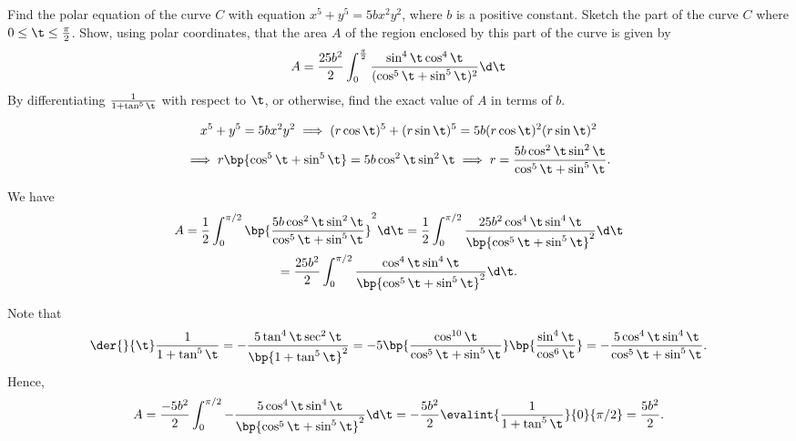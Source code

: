 \begin{problem}
    Find the polar equation of the curve $C$ with equation $x^5 + y^5 = 5bx^2y^2$, where $b$ is a positive constant. Sketch the part of the curve $C$ where $0 \leq \t \leq \frac\pi2$. Show, using polar coordinates, that the area $A$ of the region enclosed by this part of the curve is given by
    \[
        A = \frac{25b^2}2 \int_0^{\frac\pi2} \frac{\sin^4\t\cos^4\t}{(\cos^5\t + \sin^5\t)^2} \d \t
    \]
    By differentiating $\frac1{1 + \tan^5\t}$ with respect to $\t$, or otherwise, find the exact value of $A$ in terms of $b$.
\end{problem}
\begin{solution}
    \begin{gather*}
        x^5 + y^5 = 5bx^2y^2 \implies (r\cos \t)^5 + (r\sin\t)^5 = 5b(r\cos\t)^2(r\sin\t)^2\\
        \implies r\bp{\cos^5\t + \sin^5\t} = 5b\cos^2\t\sin^2\t \implies r = \frac{5b\cos^2\t\sin^2\t}{\cos^5\t + \sin^5\t}.
    \end{gather*}

    \begin{center}
    \end{center}
    We have
    \begin{gather*}
        A = \frac12 \int_0^{\pi/2} \bp{\frac{5b\cos^2\t\sin^2\t}{\cos^5\t + \sin^5\t}}^2 \d \t = \frac12 \int_0^{\pi/2} \frac{25b^2\cos^4\t\sin^4\t}{\bp{\cos^5\t + \sin^5\t}^2} \d \t \\
        = \frac{25b^2}2 \int_0^{\pi/2} \frac{\cos^4\t\sin^4\t}{\bp{\cos^5\t + \sin^5\t}^2} \d \t.
    \end{gather*}

    Note that \[\der{}{\t} \frac1{1 + \tan^5\t} = -\frac{5\tan^4\t \sec^2\t}{\bp{1 + \tan^5\t}^2} = -5 \bp{\frac{\cos^{10}\t}{\cos^5\t + \sin^5\t}}\bp{\frac{\sin^4\t}{\cos^6\t}} = -\frac{5\cos^4\t\sin^4\t}{\cos^5\t + \sin^5\t}.\] Hence, \[A = \frac{-5b^2}2 \int_0^{\pi/2} -\frac{5\cos^4\t\sin^4\t}{\bp{\cos^5\t + \sin^5\t}^2} \d \t = -\frac{5b^2}2 \evalint{\frac{1}{1 + \tan^5\t}}{0}{\pi/2} = \frac{5b^2}2.\]
\end{solution}

